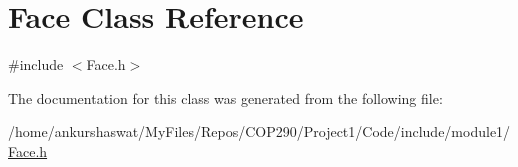 \hypertarget{classFace}{}\section{Face Class Reference}
\label{classFace}


{\ttfamily \#include $<$Face.\+h$>$}



The documentation for this class was generated from the following file\+:\begin{DoxyCompactItemize}
\item 
/home/ankurshaswat/\+My\+Files/\+Repos/\+C\+O\+P290/\+Project1/\+Code/include/module1/\hyperlink{Face_8h}{Face.\+h}\end{DoxyCompactItemize}
